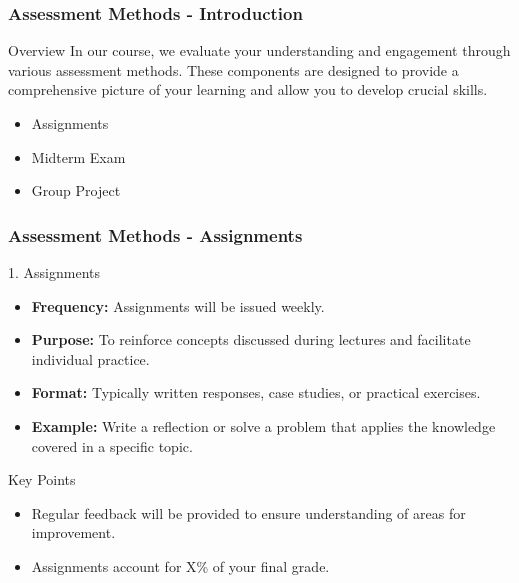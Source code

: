 \documentclass[aspectratio=169]{beamer}
\begin{document}
\begin{frame}[fragile]
    \frametitle{Assessment Methods - Introduction}
    \begin{block}{Overview}
        In our course, we evaluate your understanding and engagement through various assessment methods. These components are designed to provide a comprehensive picture of your learning and allow you to develop crucial skills. 
    \end{block}
    
    \begin{itemize}
        \item Assignments
        \item Midterm Exam
        \item Group Project
    \end{itemize}
\end{frame}

\begin{frame}[fragile]
    \frametitle{Assessment Methods - Assignments}
    \begin{block}{1. Assignments}
        \begin{itemize}
            \item \textbf{Frequency:} Assignments will be issued weekly.
            \item \textbf{Purpose:} To reinforce concepts discussed during lectures and facilitate individual practice.
            \item \textbf{Format:} Typically written responses, case studies, or practical exercises.
            \item \textbf{Example:} Write a reflection or solve a problem that applies the knowledge covered in a specific topic.
        \end{itemize}
    \end{block}
  
    \begin{block}{Key Points}
        \begin{itemize}
            \item Regular feedback will be provided to ensure understanding of areas for improvement.
            \item Assignments account for X\% of your final grade.
        \end{itemize}
    \end{block}
\end{frame}
\end{document}
